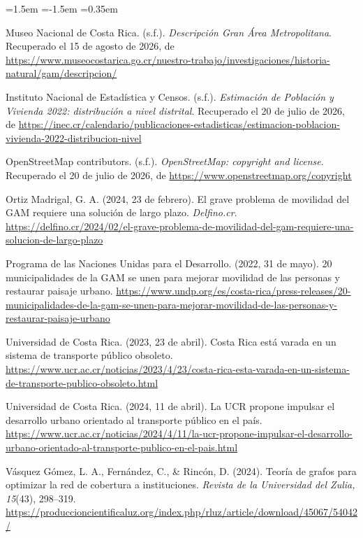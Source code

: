 \documentclass[11pt]{article}
\numberwithin{equation}{section}
\begin{document}
\begin{list}{}{\leftmargin=1.5em \itemindent=-1.5em \itemsep=0.35em}
\item Museo Nacional de Costa Rica. (s.f.). \textit{Descripción Gran Área Metropolitana}. Recuperado el 15 de agosto de 2026, de \url{https://www.museocostarica.go.cr/nuestro-trabajo/investigaciones/historia-natural/gam/descripcion/}


\item Instituto Nacional de Estadística y Censos. (s.f.). \textit{Estimación de Población y Vivienda 2022: distribución a nivel distrital}. Recuperado el 20 de julio de 2026, de \url{https://inec.cr/calendario/publicaciones-estadisticas/estimacion-poblacion-vivienda-2022-distribucion-nivel}

\item OpenStreetMap contributors. (s.f.). \textit{OpenStreetMap: copyright and license}. Recuperado el 20 de julio de 2026, de \url{https://www.openstreetmap.org/copyright}

\item Ortiz Madrigal, G. A. (2024, 23 de febrero). El grave problema de movilidad del GAM requiere una solución de largo plazo. \textit{Delfino.cr}. \url{https://delfino.cr/2024/02/el-grave-problema-de-movilidad-del-gam-requiere-una-solucion-de-largo-plazo}

\item Programa de las Naciones Unidas para el Desarrollo. (2022, 31 de mayo). 20 municipalidades de la GAM se unen para mejorar movilidad de las personas y restaurar paisaje urbano. \url{https://www.undp.org/es/costa-rica/press-releases/20-municipalidades-de-la-gam-se-unen-para-mejorar-movilidad-de-las-personas-y-restaurar-paisaje-urbano}

\item Universidad de Costa Rica. (2023, 23 de abril). Costa Rica está varada en un sistema de transporte público obsoleto. \url{https://www.ucr.ac.cr/noticias/2023/4/23/costa-rica-esta-varada-en-un-sistema-de-transporte-publico-obsoleto.html}

\item Universidad de Costa Rica. (2024, 11 de abril). La UCR propone impulsar el desarrollo urbano orientado al transporte público en el país. \url{https://www.ucr.ac.cr/noticias/2024/4/11/la-ucr-propone-impulsar-el-desarrollo-urbano-orientado-al-transporte-publico-en-el-pais.html}

\item Vásquez Gómez, L. A., Fernández, C., \& Rincón, D. (2024). Teoría de grafos para optimizar la red de cobertura a instituciones. \textit{Revista de la Universidad del Zulia, 15}(43), 298--319. \url{https://produccioncientificaluz.org/index.php/rluz/article/download/45067/54042/}

\end{list}
\normalsize
\end{document}
